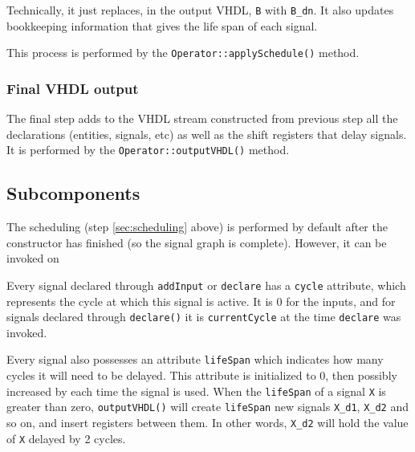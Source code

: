 \documentclass{article}
\begin{document}
Technically, it just replaces, in the output VHDL,   \verb!B! with \verb!B_dn!.
It also updates bookkeeping information that gives the life span of each signal.

This process is performed by the \verb!Operator::applySchedule()! method.

\subsubsection{Final VHDL output}
The final step adds to the VHDL stream constructed from previous step all the declarations (entities, signals, etc) as well as the shift registers that delay signals.
It is performed by the \verb!Operator::outputVHDL()! method.

\subsection{Subcomponents}

The scheduling (step \ref{sec:scheduling} above) is performed by default after the constructor has finished (so the signal graph is complete).
However, it can be invoked on 






  
\iffalse 
\item Every signal declared through \verb!addInput! or \verb!declare!
  has a \verb!cycle! attribute, which represents the cycle at which
  this signal is active. It is 0 for the inputs, and for signals
  declared through \verb!declare()! it is \verb!currentCycle!  at the
  time \verb!declare! was invoked.

\item Every signal also possesses an attribute \verb!lifeSpan! which
  indicates how many cycles it will need to be delayed. This attribute
  is initialized to 0, then possibly increased by each time the signal is used.
  When the \verb!lifeSpan! of a signal \verb!X!  is
  greater than zero, \verb!outputVHDL()! will create \verb!lifeSpan!
  new signals \verb!X_d1!, \verb!X_d2! and so on, and insert registers
  between them. In other words, \verb!X_d2! will hold the value of
  \verb!X! delayed by 2 cycles.
\end{document}
